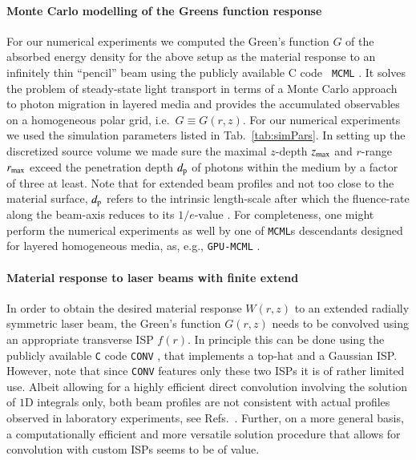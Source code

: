 \documentclass[review]{elsarticle}
\begin{document}
\paragraph{Monte Carlo modelling of the Greens function response}
For our numerical experiments we computed the Green's function $G$ of the
absorbed energy density for the above setup as the material response to an
infinitely thin ``pencil'' beam using the publicly available {\rm C} code {\tt
MCML} \cite{MCML:1995}. It solves the problem of steady-state light transport
in terms of a Monte Carlo approach to photon migration in layered media and
provides the accumulated observables on a homogeneous polar grid, i.e.\
$G\equiv G(r,z)$.  
For our numerical experiments we used the simulation parameters listed in
Tab.~\ref{tab:simPars}. In setting up the discretized source volume we made
sure the maximal $z$-depth $z_{\rm max}$ and $r$-range $r_{\rm max}$ exceed the
penetration depth $d_{\rm p}$ of photons within the medium by a factor of three
at least. Note that for extended beam profiles and not too close to the
material surface, $d_{\rm p}$ refers to the intrinsic length-scale after which
the fluence-rate along the beam-axis reduces to its $1/e$-value
\cite{MCML:1995,Wilson:1990}.  For completeness, one might perform the
numerical experiments as well by one of {\tt MCML}s descendants designed for
layered homogeneous media, as, e.g., {\tt GPU-MCML} \cite{Alerstam:2010}.

\paragraph{Material response to laser beams with finite extend}
In order to obtain the desired material response $W(r,z)$ to an extended
radially symmetric laser beam, the Green's function $G(r,z)$ needs to be
convolved using an appropriate transverse ISP $f(r)$.  
In principle this can be done using the publicly available {\tt C} 
code {\tt CONV} \cite{CONV:1997}, that implements a top-hat and a Gaussian ISP.  
However, note that since {\tt CONV} features only these two ISPs it is of 
rather limited use. Albeit allowing for a highly efficient direct convolution
involving the solution of $1$D integrals only, both beam profiles are not
consistent with actual profiles observed in laboratory experiments, see
Refs.~\cite{Paltauf:1997, Paltauf:1998, Paltauf:2000, DAlessandro:2012,
Blumenroether:2016}.  
Further, on a more general basis, a computationally efficient and more
versatile solution procedure that allows for convolution with custom ISPs seems
to be of value.
\end{document}
